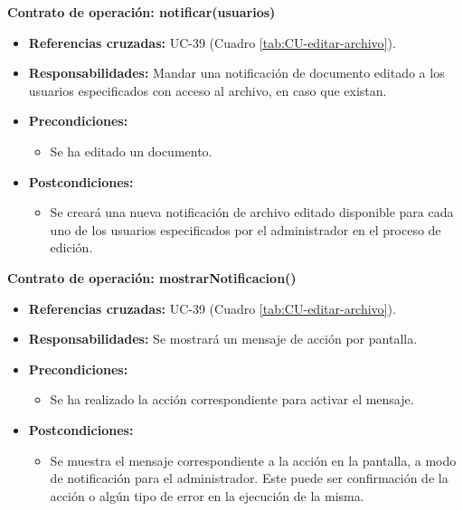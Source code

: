 \textbf{Contrato de operación: notificar(usuarios)}
\begin{itemize}
\item \textbf{Referencias cruzadas:} UC-39 (Cuadro \ref{tab:CU-editar-archivo}).
\item \textbf{Responsabilidades:} Mandar una notificación de documento editado a los usuarios especificados con acceso al archivo, en caso que existan.
\item \textbf{Precondiciones:} 
 \begin{itemize}
\item Se ha editado un documento.
\end {itemize}
\item \textbf{Postcondiciones:} 
 \begin{itemize}
\item Se creará una nueva notificación de archivo editado disponible para cada uno de los usuarios especificados por el administrador en el proceso de edición.
\end {itemize}
\end {itemize}

\textbf{Contrato de operación: mostrarNotificacion()}
\begin{itemize}
\item \textbf{Referencias cruzadas:} UC-39 (Cuadro \ref{tab:CU-editar-archivo}).
\item \textbf{Responsabilidades:} Se mostrará un mensaje de acción por pantalla.
\item \textbf{Precondiciones:} 
 \begin{itemize}
\item Se ha realizado la acción correspondiente para activar el mensaje.
\end {itemize}
\item \textbf{Postcondiciones:} 
 \begin{itemize}
\item Se muestra el mensaje correspondiente a la acción en la pantalla, a modo de notificación para el administrador. Este puede ser confirmación de la acción o algún tipo de error en la ejecución de la misma.
\end {itemize}
\end {itemize}


\vspace{10mm}

